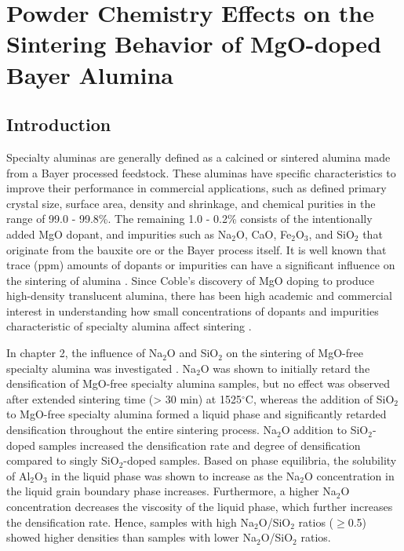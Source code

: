 \chapter{Powder Chemistry Effects on the Sintering Behavior of MgO-doped Bayer Alumina}

\section{Introduction}
Specialty aluminas are generally defined as a calcined or sintered alumina made from a Bayer processed feedstock. These aluminas have specific characteristics to improve their performance in commercial applications, such as defined primary crystal size, surface area, density and shrinkage, and chemical purities in the range of 99.0 - 99.8\%. The remaining 1.0 - 0.2\% consists of the intentionally added MgO dopant, and impurities such as Na$_{2}$O, CaO, Fe$_{2}$O$_{3}$, and SiO$_{2}$ that originate from the bauxite ore or the Bayer process itself. It is well known that trace (ppm) amounts of dopants or impurities can have a significant influence on the sintering of alumina \cite{Bae1994,Bae1997,Bae1993}. Since Coble's discovery of MgO doping to produce high-density translucent alumina, there has been high academic and commercial interest in understanding how small concentrations of dopants and impurities characteristic of specialty alumina affect sintering \cite{Bennison1990,Jorgensen1965,Heuer1979,Louet2005,Park2000a}.

In chapter 2, the influence of Na$_{2}$O and SiO$_{2}$ on the sintering of MgO-free specialty alumina was investigated \cite{Frueh2016}. Na$_{2}$O was shown to initially retard the densification of MgO-free specialty alumina samples, but no effect was observed after extended sintering time (> 30 min) at 1525$^{\circ}$C, whereas the addition of SiO$_{2}$ to MgO-free specialty alumina formed a liquid phase and significantly retarded densification throughout the entire sintering process. Na$_{2}$O addition to SiO$_{2}$-doped samples increased the densification rate and degree of densification compared to singly SiO$_{2}$-doped samples. Based on phase equilibria, the solubility of Al$_{2}$O$_{3}$ in the liquid phase was shown to increase as the Na$_{2}$O concentration in the liquid grain boundary phase increases. Furthermore, a higher Na$_{2}$O concentration decreases the viscosity of the liquid phase, which further increases the densification rate. Hence, samples with high Na$_{2}$O/SiO$_{2}$ ratios ($\geq$0.5) showed higher densities than samples with lower Na$_{2}$O/SiO$_{2}$ ratios. 

